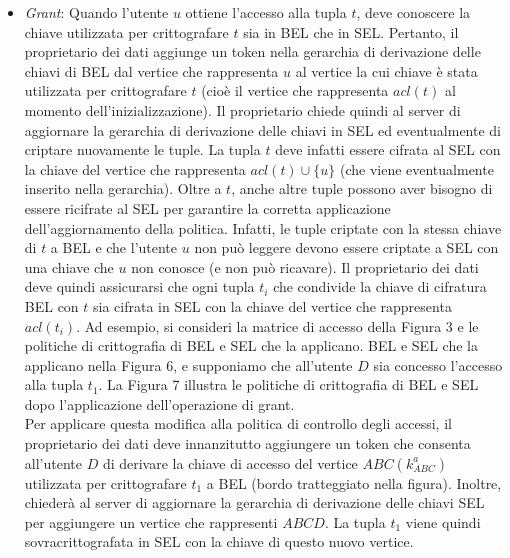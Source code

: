 \begin{itemize}
    \item \textit{Grant}: Quando l'utente $u$ ottiene l'accesso alla tupla $t$, deve conoscere la chiave utilizzata per crittografare $t$ sia in BEL che in SEL. Pertanto, il proprietario dei dati aggiunge un token nella gerarchia di derivazione delle chiavi di BEL dal vertice che rappresenta $u$ al vertice la cui chiave è stata utilizzata per crittografare $t$ (cioè il vertice che rappresenta $acl(t)$ al momento dell'inizializzazione).
    Il proprietario chiede quindi al server di aggiornare la gerarchia di derivazione delle chiavi in SEL ed eventualmente di criptare nuovamente le tuple. La tupla $t$ deve infatti essere cifrata al SEL con la chiave del vertice che rappresenta $acl(t) \cup \{u\}$ (che viene eventualmente inserito nella gerarchia). Oltre a $t$, anche altre tuple possono aver bisogno di essere ricifrate al SEL per garantire la corretta applicazione dell'aggiornamento della politica. Infatti, le tuple criptate con la stessa chiave di $t$ a BEL e che l'utente $u$ non può leggere devono essere criptate a SEL con una chiave che $u$ non conosce (e non può ricavare).
    Il proprietario dei dati deve quindi assicurarsi che ogni tupla $t_i$ che condivide la chiave di cifratura BEL con $t$ sia cifrata in SEL con la chiave del vertice che rappresenta $acl(t_i)$. Ad esempio, si consideri la matrice di accesso della Figura 3 e le politiche di crittografia di BEL e SEL che la applicano.
    BEL e SEL che la applicano nella Figura 6, e supponiamo che all'utente $D$ sia concesso l'accesso alla tupla $t_1$. La Figura 7 illustra le politiche di crittografia di BEL e SEL dopo l'applicazione dell'operazione di grant.\\
    \newline
    Per applicare questa modifica alla politica di controllo degli accessi, il proprietario dei dati deve innanzitutto aggiungere un token che consenta all'utente $D$ di derivare la chiave di accesso del vertice $ABC(k^a_{ABC})$ utilizzata per crittografare $t_1$ a BEL (bordo tratteggiato nella figura). Inoltre, chiederà al server di aggiornare la gerarchia di derivazione delle chiavi SEL per aggiungere un vertice che rappresenti $ABCD$. La tupla $t_1$ viene quindi sovracrittografata in SEL con la chiave di questo nuovo vertice.


\end{itemize}

